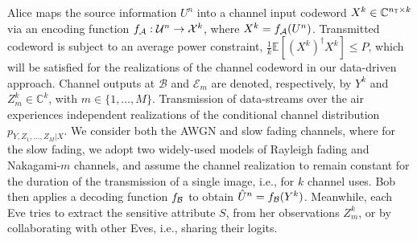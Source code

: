 \documentclass[conference]{IEEEtran}
\begin{document}
	Alice  maps the source information 
	$U^n$ into a {channel input codeword $X^k \in \mathbb{C}^{n_{\sf T} \times k}$} via an encoding 
	function {$f_{\cal A}: \mathcal{U}^n \rightarrow \mathcal{X}^k$}, where  $X^k = f_{\cal A}(U^n)$.  
	Transmitted codeword is subject to an average
	power constraint, $\frac{1}{k} \mathbb{E}[({X^k})^\dagger{X^k}] \leq P$, which will be satisfied for the realizations of the channel codeword in our data-driven approach.
	Channel outputs at $\mathcal{B}$ and $\mathcal{E}_m$  are denoted, respectively, by $Y^k$ and $Z_m^k \in \mathbb{C}^k$, with $m \in \{1, \ldots, M\}$.  
	Transmission of data-streams over the air  experiences  independent realizations of the  conditional   channel distribution $p_{Y, Z_1, \ldots, Z_M |‌X  }$.    
	We consider both the AWGN and  slow fading channels, where for the slow fading, we adopt two widely-used models of Rayleigh fading and Nakagami-$m$ channels, and {assume the channel realization to remain constant for the duration of the transmission of a single image, i.e., for $k$ channel uses.}
	Bob then applies a  decoding function
	$f_{\cal B}$ to obtain $\hat{U}^n = f_{\cal B}(Y^k)$. 
	Meanwhile, each Eve tries to extract the sensitive attribute  $S$, from her observations $Z_m^k$, or by collaborating with other Eves, i.e., sharing their logits. 
\end{document}
